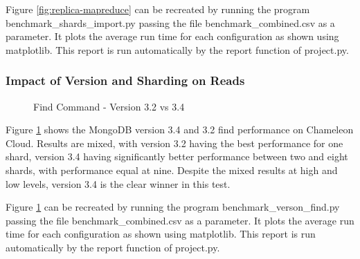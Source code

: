 \documentclass[9pt,twocolumn,twoside]{../../styles/osajnl}
\begin{document}
Figure \ref{fig:replica-mapreduce} can be recreated by running the program benchmark\_shards\_import.py passing the file benchmark\_combined.csv as a parameter.  It plots the average run time for each configuration as shown using matplotlib.  This report is run automatically by the report function of project.py.




\subsubsection{Impact of Version and Sharding on Reads}


\begin{figure}[htbp]
\centering
{}
\caption{Find Command - Version 3.2 vs 3.4}
\label{fig:version-find}
\end{figure}

Figure \ref{fig:version-find} shows the MongoDB version 3.4 and 3.2 find performance on Chameleon Cloud.  Results are mixed, with version 3.2 having the best performance for one shard, version 3.4 having significantly better performance between two and eight shards, with performance equal at nine.  Despite the mixed results at high and low levels, version 3.4 is the clear winner in this test.


Figure \ref{fig:version-find} can be recreated by running the program benchmark\_verson\_find.py passing the file benchmark\_combined.csv as a parameter.  It plots the average run time for each configuration as shown using matplotlib.  This report is run automatically by the report function of project.py.
\end{document}

